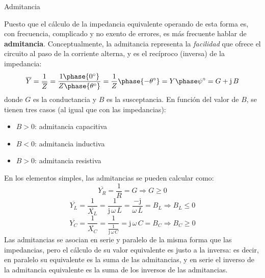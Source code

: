 \documentclass[11pt]{book} %
\makeatletter
\numberwithin{dummy}{section}
\theoremstyle{ocrenumbox}
\theoremstyle{blacknumex}
\theoremstyle{blacknumbox}
\theoremstyle{ocrenum}
\renewcommand{\subsubsection}{\@startsection {subsubsection}{3}{\z@}
{-2ex \@plus -0.1ex \@minus -.2ex}
{.2ex \@plus.2ex }
{\normalfont\small\sffamily\bfseries}}
\makeatother
\begin{document}
	\subsubsection{Admitancia}
	
	Puesto que el cálculo de la impedancia equivalente operando de esta forma es, con frecuencia, complicado y no exento de errores, es más frecuente hablar de \textbf{admitancia}. Conceptualmente, la admitancia representa la \textit{facilidad} que ofrece el circuito al paso de la corriente alterna, y es el recíproco (inversa) de la impedancia: 
	\begin{equation*}
	    \overline{Y}=\dfrac{1}{\overline{Z}}=\dfrac{1\phase{0^\circ}}{Z\phase{\theta^\circ}}=\dfrac{1}{Z}\phase{-\theta^\circ}=Y\phase\psi^\circ=G+\mathrm{j}\,B
	\end{equation*}
	donde $G$ es la conductancia y $B$ es la susceptancia. En función del valor de $B$, se tienen tres casos (al igual que con las impedancias):
	\begin{itemize}
		\item $B>0$: admitancia capacitiva
		\item $B<0$: admitancia inductiva
		\item $B>0$: admitancia resistiva
	\end{itemize}
	En los elementos simples, las admitancias se pueden calcular como: 
	\begin{equation}
		\boxed{\overline{Y_R}=\dfrac{1}{R}=G}\Rightarrow G\geq 0
	\end{equation}
	\begin{equation}
		\boxed{\overline{Y_L}=\dfrac{1}{\overline{X_L}}=\dfrac{1}{\mathrm{j}\,\omega\,L}=\dfrac{-\mathrm{j}}{\omega\,L}=B_L}\Rightarrow B_L\leq 0
	\end{equation}
	\begin{equation}
		\boxed{\overline{Y_C}=\dfrac{1}{\overline{X_C}}=\dfrac{1}{\frac{1}{\mathrm{j}\,\omega\,C}}=\mathrm{j}\,\omega\,C=B_C}\Rightarrow B_C\geq 0
	\end{equation}
	Las admitancias se asocian en serie y paralelo de la misma forma que las impedancias, pero el cálculo de su valor equivalente es justo a la inversa: es decir, en paralelo su equivalente es la suma de las admitancias, y en serie el inverso de la admitancia equivalente es la suma de los inversos de las admitancias.
	
\end{document}
